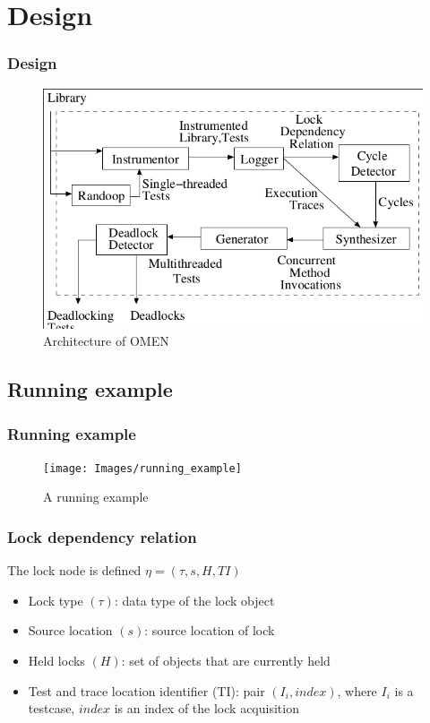 \documentclass{beamer}
\begin{document}
\section{Design}
\begin{frame}
\frametitle{Design}
\begin{figure}[ht!]
     \begin{center}
%
       
      \includegraphics[scale = 0.4]{Images/design}
        
%
    \end{center}
    \caption{%
        Architecture of OMEN
     }%
   \label{fig:subfigures}
\end{figure}

\end{frame}

\subsection{Running example}
\begin{frame}
\frametitle{Running example}
\begin{figure}[ht!]
     \begin{center}
%
       
      \texttt{[image: Images/running\_example]}
        
%
    \end{center}
    \caption{%
        A running example
     }%
   \label{fig:subfigures}
\end{figure}
\end{frame}

\begin{frame}
\frametitle{Lock dependency relation}
The lock node is defined $\eta = (\tau, s, H, TI) $
\begin{itemize}
\item Lock type $(\tau)$: data type of the lock object
\item Source location $(s)$: source location of lock
\item Held locks $(H)$: set of objects that are currently held
\item Test and trace location identifier (TI): pair $(I_i, index)$, where $I_i$ is a testcase, $index$ is an index of the lock acquisition
\end{itemize}
\end{frame}
\end{document}

